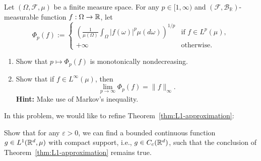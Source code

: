 \begin{problem}
	Let $(\Omega,\mathcal{F},\mu)$ be a finite measure space. For any $p\in[1,\infty)$ and $(\mathcal{F},\mathcal{B}_\mathbb{R})$-measurable function $f:\Omega\to\mathbb R$, let 
	\[
		\Phi_p(f) := \begin{cases}\displaystyle
			\left(\frac{1}{\mu(\Omega)}\int_\Omega |f(\omega)|^p \mu(d\omega)\right)^{1/p} &\text{if $f\in L^p(\mu)$},\\
			+\infty &\text{otherwise}.
		\end{cases}
	\]
	\begin{enumerate}[label={(\alph*)}]
		\item Show that $p\mapsto \Phi_p(f)$ is monotonically nondecreasing.
		\item Show that if $f\in L^\infty(\mu)$, then
		\[
			\lim_{p\to\infty} \Phi_p(f) = \|f\|_\infty.
		\]
			\textbf{Hint:} Make use of Markov's inequality.
	\end{enumerate}
\end{problem}

\begin{problem}
	In this problem, we would like to refine Theorem~\ref{thm:L1-approximation}:
	
	Show that for any $\varepsilon>0$, we can find a bounded continuous function $g\in L^1(\mathbb R^d,\mu)$ with compact support, i.e., $g\in C_c(\mathbb R^d)$, such that the conclusion of Theorem~\ref{thm:L1-approximation} remains true.
\end{problem}




